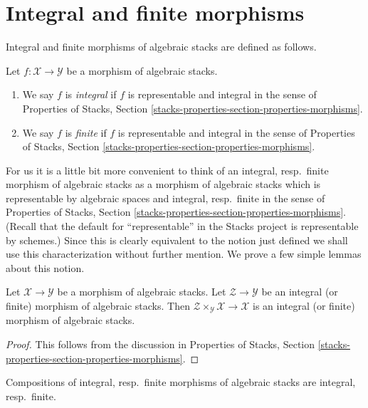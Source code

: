 \section{Integral and finite morphisms}
\label{section-integral}

\noindent
Integral and finite morphisms of algebraic stacks are defined as follows.

\begin{definition}
\label{definition-integral}
Let $f : \mathcal{X} \to \mathcal{Y}$ be a morphism of algebraic stacks.
\begin{enumerate}
\item We say $f$ is {\it integral} if $f$ is representable and integral
in the sense of Properties of Stacks, Section
\ref{stacks-properties-section-properties-morphisms}.
\item We say $f$ is {\it finite} if $f$ is representable and integral
in the sense of Properties of Stacks, Section
\ref{stacks-properties-section-properties-morphisms}.
\end{enumerate}
\end{definition}

\noindent
For us it is a little bit more convenient to think of an
integral, resp.\ finite morphism of algebraic stacks as a
morphism of algebraic stacks which is
representable by algebraic spaces and integral, resp.\ finite
in the sense of Properties of Stacks, Section
\ref{stacks-properties-section-properties-morphisms}.
(Recall that the default for ``representable'' in the Stacks project
is representable by schemes.)
Since this is clearly equivalent to the notion just defined we shall
use this characterization without further mention.
We prove a few simple lemmas about this notion.

\begin{lemma}
\label{lemma-base-change-integral}
Let $\mathcal{X} \to \mathcal{Y}$ be a morphism of algebraic stacks.
Let $\mathcal{Z} \to \mathcal{Y}$ be an integral (or finite)
morphism of algebraic stacks. Then
$\mathcal{Z} \times_\mathcal{Y} \mathcal{X} \to \mathcal{X}$
is an integral (or finite) morphism of algebraic stacks.
\end{lemma}

\begin{proof}
This follows from the discussion in
Properties of Stacks, Section
\ref{stacks-properties-section-properties-morphisms}.
\end{proof}

\begin{lemma}
\label{lemma-composition-integral}
Compositions of integral, resp.\ finite morphisms of algebraic stacks
are integral, resp.\ finite.
\end{lemma}

